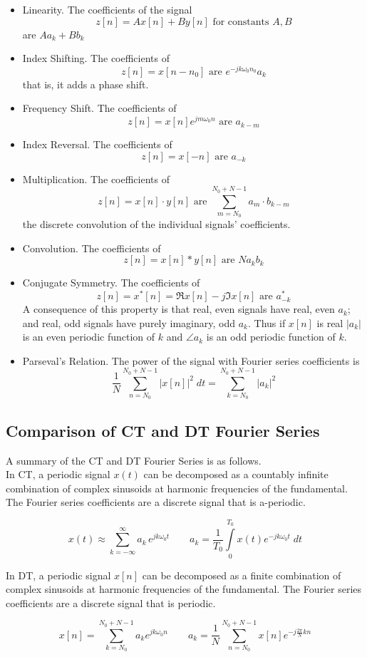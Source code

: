 \begin{itemize}
\item Linearity. The coefficients of the signal
  \[
  z[n] = Ax[n] + By[n] \mbox{ for constants } A,B 
  \]
  are $Aa_k + Bb_k$
\item Index Shifting. The coefficients of
  \[
  z[n] = x[n-n_0] \mbox{ are } e^{-jk\omega_0 n_0}a_k
  \]
  that is, it adds a phase shift.
\item Frequency Shift. The coefficients of
  \[
  z[n] = x[n]e^{jm\omega_0n} \mbox{ are } a_{k-m}
  \]
\item Index Reversal. The coefficients of
  \[
  z[n] = x[-n] \mbox{ are } a_{-k}
  \]
\item Multiplication. The coefficients of
  \[
  z[n] = x[n] \cdot y[n] \mbox{ are } \sum\limits_{m = N_0}^{N_0 + N -1} a_m\cdot b_{k-m}
  \]
  the discrete convolution of the individual signals' coefficients.
\item Convolution. The coefficients of
  \[
  z[n] = x[n] * y[n] \mbox{ are } N a_k b_k
  \] 
\item Conjugate Symmetry. The coefficients of
  \[
  z[n] = x^*[n] = \Re{x[n]} - j\Im{x[n]} \mbox{ are } a_{-k}^*
  \]
  A consequence of this property is that real, even signals have real, even $a_k$; and real, odd signals have purely imaginary, odd  $a_k$. Thus if $x[n]$ is real  $|a_k|$ is an even periodic function of $k$ and $\angle a_k$ is an odd periodic function of $k$. 
\item Parseval's Relation. The power of the signal with Fourier series coefficients is
  \[
  \frac{1}{N} \sum\limits_{n = N_0}^{N_0 + N -1} |x[n]|^2\;dt = \sum\limits_{k = N_0}^{N_0+N-1} |a_k|^2
  \]
\end{itemize}


\subsection{Comparison of CT and DT Fourier Series}
A summary of the CT and DT Fourier Series is as follows.\\

In CT, a periodic signal $x(t)$ can be decomposed as a countably infinite combination of complex sinusoids at harmonic frequencies of the fundamental. The Fourier series coefficients are a discrete signal that is a-periodic.

\[
x(t) \approx \sum\limits_{k = -\infty}^{\infty} a_k \, e^{j k\omega_0 t}
\hspace{2em}
a_k = \frac{1}{T_0} \int\limits_{0}^{T_0} x(t)e^{-jk\omega_0 t} \; dt
\]

In DT, a periodic signal $x[n]$ can be decomposed as a finite combination of complex sinusoids at harmonic frequencies of the fundamental. The Fourier series coefficients are a discrete signal that is periodic.

\[  
x[n] = \sum\limits_{k = N_0}^{N_0 + N-1} a_k e^{jk\omega_0n}
\hspace{2em}
a_k = \frac{1}{N} \sum\limits_{n = N_0}^{N_0+N-1} x[n]e^{-j\frac{2\pi}{N} k n }
\]
